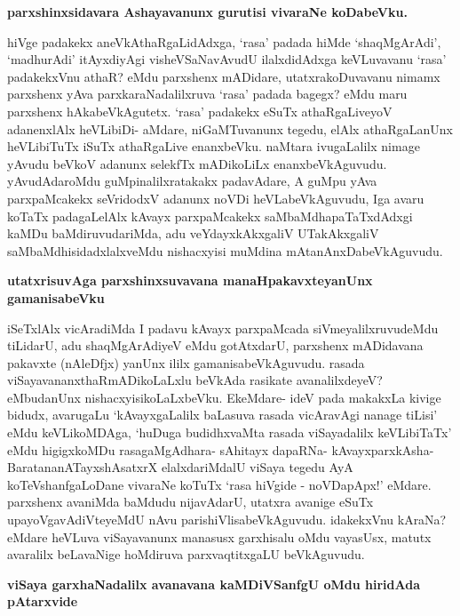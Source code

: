 \noindent
{\bf\large{parxshinxsidavara Ashayavanunx gurutisi vivaraNe koDabeVku.}}\label{page218}

hiVge padakekx aneVkAthaRgaLidAdxga, `rasa' padada hiMde `shaqMgArAdi', `madhurAdi' itAyxdiyAgi visheVSaNavAvudU ilalxdidAdxga keVLuvavanu `rasa' padakekxVnu athaR? eMdu parxshenx mADidare, utatxrakoDuvavanu nimamx parxshenx yAva parxkaraNadalilxruva `rasa' padada bagegx? eMdu maru parxshenx hAkabeVkAgutetx. `rasa' padakekx eSuTx athaRgaLiveyoV adanenxlAlx heVLibiDi- aMdare, niGaMTuvanunx tegedu, elAlx athaRgaLanUnx heVLibiTuTx iSuTx athaRgaLive enanxbeVku. naMtara ivugaLalilx nimage yAvudu beVkoV adanunx selekfTx mADikoLiLx enanxbeVkAguvudu. yAvudAdaroMdu guMpinalilxratakakx padavAdare, A guMpu yAva parxpaMcakekx seVridodxV adanunx noVDi heVLabeVkAguvudu, Iga avaru koTaTx padagaLelAlx kAvayx parxpaMcakekx saMbaMdhapaTaTxdAdxgi kaMDu baMdiruvudariMda, adu veYdayxkAkxgaliV UTakAkxgaliV saMbaMdhisidadxlalxveMdu nishacxyisi muMdina mAtanAnxDabeVkAguvudu.

\noindent
{\bf\large{utatxrisuvAga parxshinxsuvavana manaHpakavxteyanUnx gamanisabeVku}}\label{page219}

iSeTxlAlx vicAradiMda I padavu kAvayx parxpaMcada siVmeyalilxruvudeMdu tiLidarU, adu shaqMgArAdiyeV eMdu gotAtxdarU, parxshenx mADidavana pakavxte (nAleDfjx) yanUnx ililx gamanisabeVkAguvudu. rasada viSayavananxthaRmADikoLaLxlu beVkAda rasikate avanalilxdeyeV? eMbudanUnx nishacxyisikoLaLxbeVku. EkeMdare- ideV pada makakxLa kivige bidudx, avarugaLu `kAvayxgaLalilx baLasuva rasada vicAravAgi nanage tiLisi' eMdu keVLikoMDAga, `huDuga budidhxvaMta rasada viSayadalilx keVLibiTaTx' eMdu higigxkoMDu rasagaMgAdhara- sAhitayx dapaRNa- kAvayxparxkAsha- BaratananATayxshAsatxrX elalxdariMdalU viSaya tegedu AyA koTeVshanfgaLoDane vivaraNe koTuTx `rasa hiVgide - noVDapApx!' eMdare. parxshenx avaniMda baMdudu nijavAdarU, utatxra avanige eSuTx upayoVgavAdiVteyeMdU nAvu parishiVlisabeVkAguvudu. idakekxVnu kAraNa? eMdare heVLuva viSayavanunx manasusx garxhisalu oMdu vayasUsx, matutx avaralilx beLavaNige hoMdiruva parxvaqtitxgaLU beVkAguvudu.

\noindent
{\bf\large{viSaya garxhaNadalilx avanavana kaMDiVSanfgU oMdu hiridAda pAtarxvide}}\label{page219}

